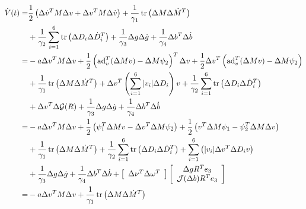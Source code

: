 \begin{align}
\dot{V}(t)
 =&\frac{1}{2}\left(\Delta \dot{v}^T M \Delta v
   +\Delta v^T M \Delta\dot{ v}\right)  
   +\frac{1}{\gamma_1}\tr\left(\Delta M \Delta\dot{ M}^{T}\right)
  \nonumber \\
  &+\frac{1}{\gamma_2}\sum_{i=1}^6\tr\left(\Delta D_i \Delta\dot{ D}_i^{T}\right)
   +\frac{1}{\gamma_3}\Delta g \Delta\dot{ g}
   +\frac{1}{\gamma_4}\Delta b^T \Delta\dot{ b}
  \nonumber  \\
 =&-a\Delta v^T M \Delta v
   +\frac{1}{2}\left(\ad_v^T(\Delta M v) -\Delta M \psi_2\right)^T \Delta v
  +\frac{1}{2}\Delta v^T \left(\ad_v^T(\Delta M v) -\Delta M \psi_2\right)
  \nonumber  \\
  &+\frac{1}{\gamma_1}\tr\left(\Delta M \Delta\dot{ M}^{T}\right) 
  +\Delta v^T \left(\sum_{i=1}^6 |v_i|\Delta D_i\right) v 
   +\frac{1}{\gamma_2}\sum_{i=1}^6\tr\left(\Delta D_i \Delta\dot{ D}_i^{T}\right)
  \nonumber  \\
  &+\Delta v^T\Delta \mathcal{G} (R) +\frac{1}{\gamma_3}\Delta g \Delta\dot{ g}
   +\frac{1}{\gamma_4}\Delta b^T \Delta\dot{ b}
  \nonumber  \\
 =&-a\Delta v^T M \Delta v
   +\frac{1}{2}\left(\psi_1^T \Delta M v -\Delta v^T \Delta M \psi_2\right)
  +\frac{1}{2}\left(v^T \Delta M \psi_1 -\psi_2^T \Delta M \Delta v\right) 
  \nonumber  \\
  &+\frac{1}{\gamma_1}\tr\left(\Delta M \Delta\dot{ M}^{T}\right)
   +\frac{1}{\gamma_2}\sum_{i=1}^6\tr\left(\Delta D_i \Delta\dot{ D}_i^{T}\right)
  +\sum_{i=1}^6\left(|v_i|\Delta v^T \Delta D_i v\right)
  \nonumber \\
  & +\frac{1}{\gamma_3}\Delta g \Delta\dot{ g}
   +\frac{1}{\gamma_4}\Delta b^T \Delta\dot{ b}
  +\left[ \begin{array}{cc}\Delta \nu^T \Delta \omega^T \\ \end{array}\right]
    \left[ \begin{array}{c}\Delta g R^T e_3   
    \\ \mathcal{J}(\Delta b)R^T e_3 \\ \end{array}\right]
  \nonumber \\
 =&-a\Delta v^T M \Delta v
    +\frac{1}{\gamma_1}\tr\left(\Delta M \Delta\dot{ M}^{T}\right)   

\end{align}
